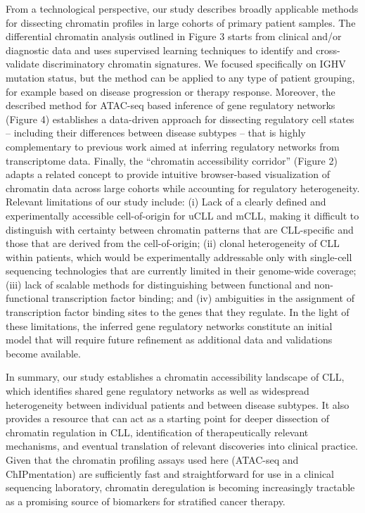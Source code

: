 \documentclass[10pt,]{article}
\begin{document}
From a technological perspective, our study describes broadly applicable
methods for dissecting chromatin profiles in large cohorts of primary
patient samples. The differential chromatin analysis outlined in Figure
3 starts from clinical and/or diagnostic data and uses supervised
learning techniques to identify and cross-validate discriminatory
chromatin signatures. We focused specifically on IGHV mutation status,
but the method can be applied to any type of patient grouping, for
example based on disease progression or therapy response. Moreover, the
described method for ATAC-seq based inference of gene regulatory
networks (Figure 4) establishes a data-driven approach for dissecting
regulatory cell states -- including their differences between disease
subtypes -- that is highly complementary to previous work aimed at
inferring regulatory networks from transcriptome
data\citep{Basso2005, Lefebvre2010, Yepes2015}. Finally, the ``chromatin
accessibility corridor'' (Figure 2) adapts a related
concept\citep{Bock2011} to provide intuitive browser-based visualization
of chromatin data across large cohorts while accounting for regulatory
heterogeneity. Relevant limitations of our study include: (i) Lack of a
clearly defined and experimentally accessible cell-of-origin for uCLL
and mCLL, making it difficult to distinguish with certainty between
chromatin patterns that are CLL-specific and those that are derived from
the cell-of-origin; (ii) clonal heterogeneity of CLL within patients,
which would be experimentally addressable only with single-cell
sequencing technologies\citep{Buenrostro2015, Jin2015} that are
currently limited in their genome-wide coverage; (iii) lack of scalable
methods for distinguishing between functional and non-functional
transcription factor binding; and (iv) ambiguities in the assignment of
transcription factor binding sites to the genes that they regulate. In
the light of these limitations, the inferred gene regulatory networks
constitute an initial model that will require future refinement as
additional data and validations become available.

In summary, our study establishes a chromatin accessibility landscape of
CLL, which identifies shared gene regulatory networks as well as
widespread heterogeneity between individual patients and between disease
subtypes. It also provides a resource that can act as a starting point
for deeper dissection of chromatin regulation in CLL, identification of
therapeutically relevant mechanisms, and eventual translation of
relevant discoveries into clinical practice. Given that the chromatin
profiling assays used here (ATAC-seq and ChIPmentation) are sufficiently
fast and straightforward for use in a clinical sequencing laboratory,
chromatin deregulation is becoming increasingly tractable as a promising
source of biomarkers for stratified cancer therapy.
\end{document}
